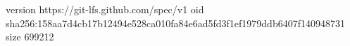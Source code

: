 version https://git-lfs.github.com/spec/v1
oid sha256:158aa7d4cb17b12494e528ca010fa84e6ad5fd3f1ef1979ddb6407f140948731
size 699212
